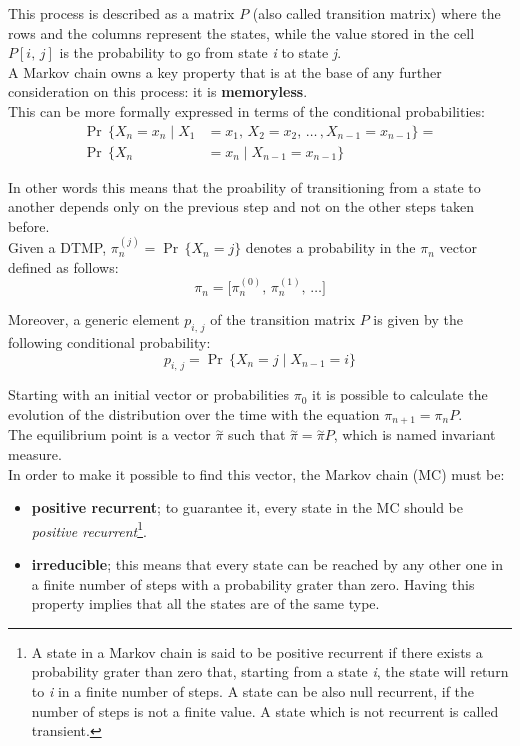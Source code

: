 This process is described as a matrix \( P \) (also called transition matrix) where the rows and the columns represent the states, while the value stored in the cell \( P[i,\,j] \) is the probability to go from state \emph{i} to state \emph{j}.\\
A Markov chain owns a key property that is at the base of any further consideration on this process: it is \textbf{memoryless}.\\
This can be more formally expressed in terms of the conditional probabilities:
\begin{equation} \tag{3} \label{memoryless}
\begin{split}
  \Pr\,\{X_{n} = x_{n} \mid X_{1} &= x_{1},\,X_{2} = x_{2},\,\dots\,, X_{n-1} = x_{n-1} \} =\\
  \Pr\,\{X_{n} &= x_{n} \mid X_{n-1} = x_{n-1}  \}
\end{split}
\end{equation}

In other words this means that the proability of transitioning from a state to another depends only on the previous step and not on the other steps taken before.\\
Given a DTMP, \( \pi_{n}^{(j)} = \Pr\,\{X_{n} = j\}\) denotes a probability in the \( \pi_{n} \) vector defined as follows:
\begin{equation*}
  \pi_{n} =  \big[\pi_{n}^{(0)},\,\pi_{n}^{(1)},\,\dots \big]
\end{equation*}

Moreover, a generic element \(p_{i,\,j}\) of the transition matrix \( P \) is given by the following conditional probability:
\begin{equation*}
  p_{i,\,j} = \Pr\,\{X_{n} = j \mid X_{n-1} = i\}
\end{equation*}

Starting with an initial vector or probabilities \( \pi_{0} \) it is possible to calculate the evolution of the distribution over the time with the equation \( \pi_{n+1} = \pi_{n}P \).\\
The equilibrium point is a vector \( \overset{\sim}{\pi} \) such that \( \overset{\sim}{\pi} = \overset{\sim}{\pi}P \), which is named invariant measure.\\
In order to make it possible to find this vector, the Markov chain (MC) must be:
\begin{itemize}
  \item \textbf{positive recurrent}; to guarantee it, every state in the MC should be \emph{positive recurrent}\footnote{A state in a Markov chain is said to be positive recurrent if there exists a probability grater than zero that, starting from a state \emph{i}, the state will return to \emph{i} in a finite number of steps. A state can be also null recurrent, if the number of steps is not a finite value. A state which is not recurrent is called transient.}. 
  \item \textbf{irreducible}; this means that every state can be reached by any other one in a finite number of steps with a probability grater than zero. Having this property implies that all the states are of the same type.  
\end{itemize}

